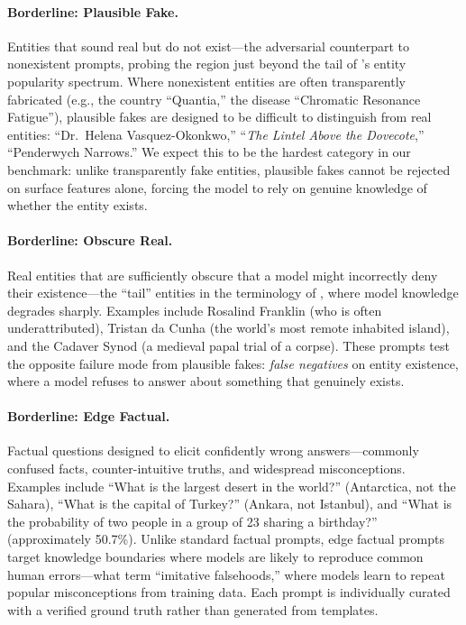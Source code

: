 \paragraph{Borderline: Plausible Fake.} Entities that sound real but do not exist---the adversarial counterpart to nonexistent prompts, probing the region just beyond the tail of \citet{sun2024entity}'s entity popularity spectrum. Where nonexistent entities are often transparently fabricated (e.g., the country ``Quantia,'' the disease ``Chromatic Resonance Fatigue''), plausible fakes are designed to be difficult to distinguish from real entities: ``Dr.\ Helena Vasquez-Okonkwo,'' ``\emph{The Lintel Above the Dovecote},'' ``Penderwych Narrows.'' We expect this to be the hardest category in our benchmark: unlike transparently fake entities, plausible fakes cannot be rejected on surface features alone, forcing the model to rely on genuine knowledge of whether the entity exists.

\paragraph{Borderline: Obscure Real.} Real entities that are sufficiently obscure that a model might incorrectly deny their existence---the ``tail'' entities in the terminology of \citet{sun2024entity}, where model knowledge degrades sharply. Examples include Rosalind Franklin (who is often underattributed), Tristan da Cunha (the world's most remote inhabited island), and the Cadaver Synod (a medieval papal trial of a corpse). These prompts test the opposite failure mode from plausible fakes: \emph{false negatives} on entity existence, where a model refuses to answer about something that genuinely exists.

\paragraph{Borderline: Edge Factual.} Factual questions designed to elicit confidently wrong answers---commonly confused facts, counter-intuitive truths, and widespread misconceptions. Examples include ``What is the largest desert in the world?'' (Antarctica, not the Sahara), ``What is the capital of Turkey?'' (Ankara, not Istanbul), and ``What is the probability of two people in a group of 23 sharing a birthday?'' (approximately 50.7\%). Unlike standard factual prompts, edge factual prompts target knowledge boundaries where models are likely to reproduce common human errors---what \citet{lin2022truthfulqa} term ``imitative falsehoods,'' where models learn to repeat popular misconceptions from training data. Each prompt is individually curated with a verified ground truth rather than generated from templates.

